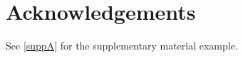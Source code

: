 \documentclass[aoas,preprint]{imsart}
\numberwithin{equation}{section}
\theoremstyle{plain}
\begin{document}







\section*{Acknowledgements}
See \ref{suppA} for the supplementary material example.








% 
\end{document}
